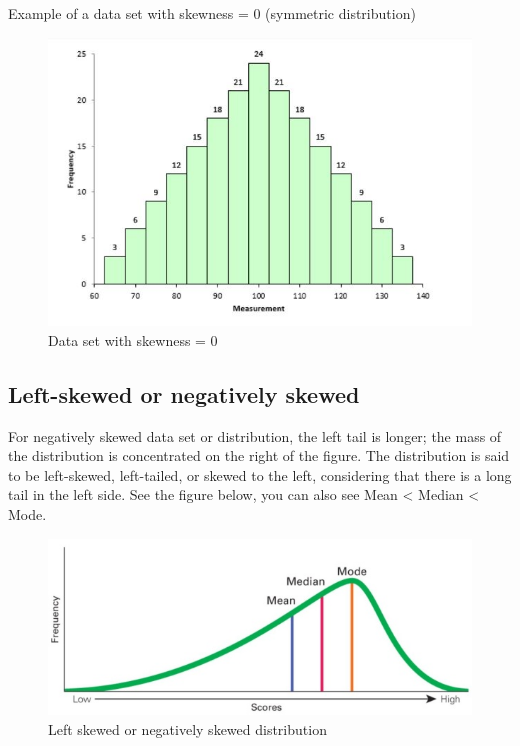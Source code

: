 \documentclass[
]{book}
\begin{document}
Example of a data set with skewness = 0 (symmetric distribution)

\begin{figure}

{\centering \includegraphics[width=0.7\linewidth]{images/image4_5} 

}

\caption{Data set with skewness = 0}\label{fig:sk0}
\end{figure}

\subsection{Left-skewed or negatively skewed}\label{left-skewed-or-negatively-skewed}

For negatively skewed data set or distribution, the left tail is longer; the mass of the distribution is concentrated on the right of the figure. The distribution is said to be left-skewed, left-tailed, or skewed to the left, considering that there is a long tail in the left side. See the figure below, you can also see Mean \textless{} Median \textless{} Mode.

\begin{figure}

{\centering \includegraphics[width=0.7\linewidth]{images/image5_5} 

}

\caption{Left skewed or negatively skewed distribution}\label{fig:sk1}
\end{figure}
\end{document}
